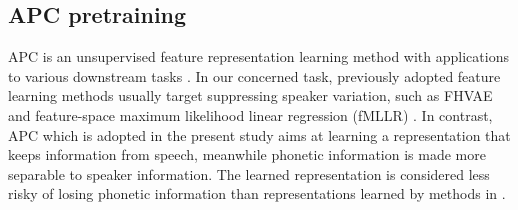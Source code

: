 \documentclass[a4paper]{article}
\begin{document}
\subsection{APC pretraining}
\label{subsec:apc}
APC is an unsupervised  feature representation learning method  with applications to various downstream tasks \cite{Chung2019}. 
In our concerned task, previously adopted feature learning methods 
usually target suppressing speaker variation, such as FHVAE \cite{Feng2019improving} and feature-space maximum likelihood linear regression (fMLLR) \cite{heck2017feature}. In contrast, 
APC which is adopted in the present study aims at learning
a representation that keeps information from speech, meanwhile phonetic information is made more separable to speaker information. The learned representation is considered less risky of losing phonetic information than 
  representations learned by methods in \cite{Feng2019improving,heck2017feature}.


\end{document}
